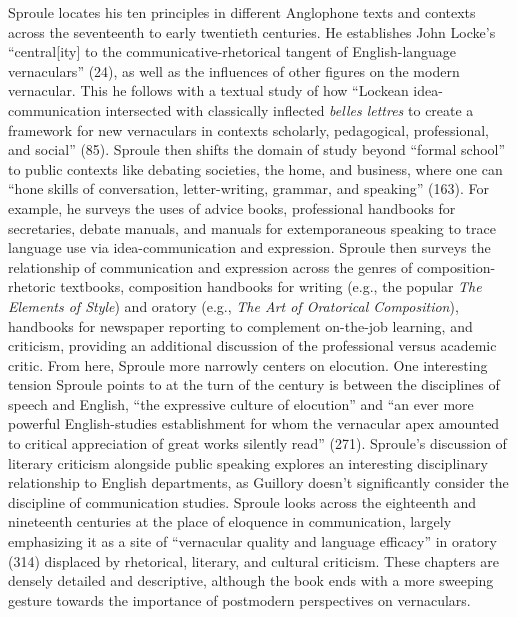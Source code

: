 \documentclass{tufte-handout}
\begin{document}
Sproule locates his ten principles in different Anglophone texts and
contexts across the seventeenth to early twentieth centuries. He
establishes John Locke's ``central{[}ity{]} to the
communicative-rhetorical tangent of English-language vernaculars'' (24),
as well as the influences of other figures on the modern vernacular.
This he follows with a textual study of how ``Lockean idea-communication
intersected with classically inflected \emph{belles lettres} to create a
framework for new vernaculars in contexts scholarly, pedagogical,
professional, and social'' (85). Sproule then shifts the domain of study
beyond ``formal school'' to public contexts like debating societies, the
home, and business, where one can ``hone skills of conversation,
letter-writing, grammar, and speaking'' (163). For example, he surveys
the uses of advice books, professional handbooks for secretaries, debate
manuals, and manuals for extemporaneous speaking to trace language use
via idea-communication and expression. Sproule then surveys the
relationship of communication and expression across the genres of
composition-rhetoric textbooks, composition handbooks for writing (e.g.,
the popular \emph{The Elements of Style}) and oratory (e.g., \emph{The
Art of Oratorical Composition}), handbooks for newspaper reporting to
complement on-the-job learning, and criticism, providing an additional
discussion of the professional versus academic critic. From here,
Sproule more narrowly centers on elocution. One interesting tension
Sproule points to at the turn of the century is between the disciplines
of speech and English, ``the expressive culture of elocution'' and ``an
ever more powerful English-studies establishment for whom the vernacular
apex amounted to critical appreciation of great works silently read''
(271). Sproule's discussion of literary criticism alongside public
speaking explores an interesting disciplinary relationship to English
departments, as Guillory doesn't significantly consider the discipline
of communication studies. Sproule looks across the eighteenth and
nineteenth centuries at the place of eloquence in communication, largely
emphasizing it as a site of ``vernacular quality and language efficacy''
in oratory (314) displaced by rhetorical, literary, and cultural
criticism. These chapters are densely detailed and descriptive, although
the book ends with a more sweeping gesture towards the importance of
postmodern perspectives on vernaculars.

\enlargethispage{\baselineskip}
\end{document}
